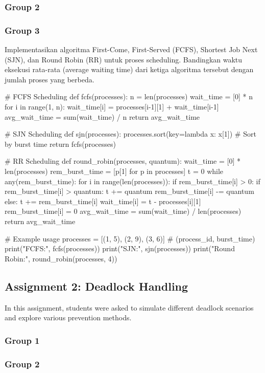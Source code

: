 \documentclass[12pt]{article}
\begin{document}
\subsubsection{Group 2}
\subsubsection{Group 3}
Implementasikan algoritma First-Come, First-Served (FCFS), Shortest Job Next (SJN), dan Round Robin (RR) untuk proses scheduling. Bandingkan waktu eksekusi rata-rata (average waiting time) dari ketiga algoritma tersebut dengan jumlah proses yang berbeda.
\begin{python}
    # FCFS Scheduling
def fcfs(processes):
    n = len(processes)
    wait_time = [0] * n
    for i in range(1, n):
        wait_time[i] = processes[i-1][1] + wait_time[i-1]
    avg_wait_time = sum(wait_time) / n
    return avg_wait_time

# SJN Scheduling
def sjn(processes):
    processes.sort(key=lambda x: x[1])  # Sort by burst time
    return fcfs(processes)

# RR Scheduling
def round_robin(processes, quantum):
    wait_time = [0] * len(processes)
    rem_burst_time = [p[1] for p in processes]
    t = 0
    while any(rem_burst_time):
        for i in range(len(processes)):
            if rem_burst_time[i] > 0:
                if rem_burst_time[i] > quantum:
                    t += quantum
                    rem_burst_time[i] -= quantum
                else:
                    t += rem_burst_time[i]
                    wait_time[i] = t - processes[i][1]
                    rem_burst_time[i] = 0
    avg_wait_time = sum(wait_time) / len(processes)
    return avg_wait_time

# Example usage
processes = [(1, 5), (2, 9), (3, 6)]  # (process_id, burst_time)
print("FCFS:", fcfs(processes))
print("SJN:", sjn(processes))
print("Round Robin:", round_robin(processes, 4))
\end{python}

\subsection{Assignment 2: Deadlock Handling}
In this assignment, students were asked to simulate different deadlock scenarios and explore various prevention methods.
\subsubsection{Group 1}
\subsubsection{Group 2}
\end{document}
